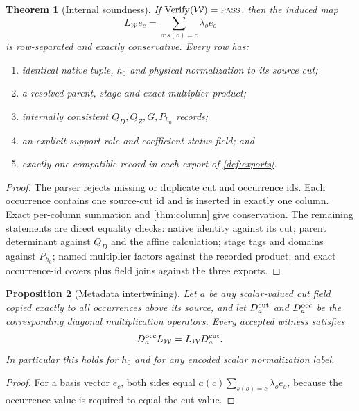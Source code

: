 \documentclass[11pt]{article}
\newtheorem{theorem}{Theorem}[section]
\newtheorem{proposition}[theorem]{Proposition}
\numberwithin{equation}{section}
\theoremstyle{definition}
\theoremstyle{remark}
\newcommand{\PASS}{\textnormal{\textsc{pass}}}
\begin{document}
\begin{theorem}[Internal soundness]
\label{thm:soundness}
If \(\operatorname{Verify}(\mathcal W)=\PASS\), then the induced map
\begin{equation}
 L_{\mathcal W}e_c
   =\sum_{o:s(o)=c}\lambda_o e_o\qquad
 \label{eq:induced-map}
\end{equation}
is row-separated and exactly conservative.  Every row has:
\begin{enumerate}[label=(\roman*),leftmargin=2.2em]
\item identical native tuple, \(h_0\) and physical normalization to
  its source cut;
\item a resolved parent, stage and exact multiplier product;
\item internally consistent \(Q_D,Q_Z,G,P_{h_0}\) records;
\item an explicit support role and coefficient-status field; and
\item exactly one compatible record in each export of
  \cref{def:exports}.
\end{enumerate}
\end{theorem}

\begin{proof}
The parser rejects missing or duplicate cut and occurrence ids.
Each occurrence contains one source-cut id and is inserted in exactly
one column.  Exact per-column summation and \cref{thm:column} give
conservation.  The remaining statements are direct equality checks:
native identity against its cut; parent determinant against \(Q_D\)
and the affine calculation; stage tags and domains against
\(P_{h_0}\); named multiplier factors against the recorded product;
and exact occurrence-id covers plus field joins against the three
exports.
\end{proof}

\begin{proposition}[Metadata intertwining]
\label{prop:intertwining}
Let \(a\) be any scalar-valued cut field copied exactly to all
occurrences above its source, and let \(D_a^{\rm cut}\) and
\(D_a^{\rm occ}\) be the corresponding diagonal multiplication
operators.  Every accepted witness satisfies
\begin{equation}
 D_a^{\rm occ}L_{\mathcal W}
   =L_{\mathcal W}D_a^{\rm cut}.
\end{equation}
In particular this holds for \(h_0\) and for any encoded scalar
normalization label.
\end{proposition}

\begin{proof}
For a basis vector \(e_c\), both sides equal
\(a(c)\sum_{s(o)=c}\lambda_oe_o\), because the occurrence value is
required to equal the cut value.
\end{proof}
\end{document}
